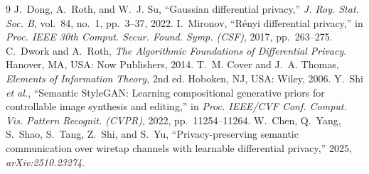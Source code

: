 \documentclass[10pt,twocolumn,letterpaper]{article}
\begin{document}
\begin{thebibliography}{9}
 J.~Dong, A.~Roth, and W.~J. Su,
``Gaussian differential privacy,'' \emph{J. Roy. Stat. Soc. B}, vol.~84,
no.~1, pp.~3--37, 2022.
 I.~Mironov, ``R\'enyi differential privacy,'' in
\emph{Proc. IEEE 30th Comput. Secur. Found. Symp. (CSF)}, 2017, pp.~263--275.
 C.~Dwork and A.~Roth, \emph{The Algorithmic Foundations of
Differential Privacy}. Hanover, MA, USA: Now Publishers, 2014.
 T.~M. Cover and J.~A. Thomas, \emph{Elements of Information
Theory}, 2nd ed. Hoboken, NJ, USA: Wiley, 2006.
 Y.~Shi \emph{et al.}, ``Semantic StyleGAN: Learning
compositional generative priors for controllable image synthesis and editing,''
in \emph{Proc. IEEE/CVF Conf. Comput. Vis. Pattern Recognit. (CVPR)}, 2022,
pp.~11254--11264.
 W.~Chen, Q.~Yang, S.~Shao, S.~Tang, Z.~Shi, and S.~Yu,
``Privacy-preserving semantic communication over wiretap channels with learnable
differential privacy,'' 2025, \emph{arXiv:2510.23274}.
\end{thebibliography}
\end{document}
